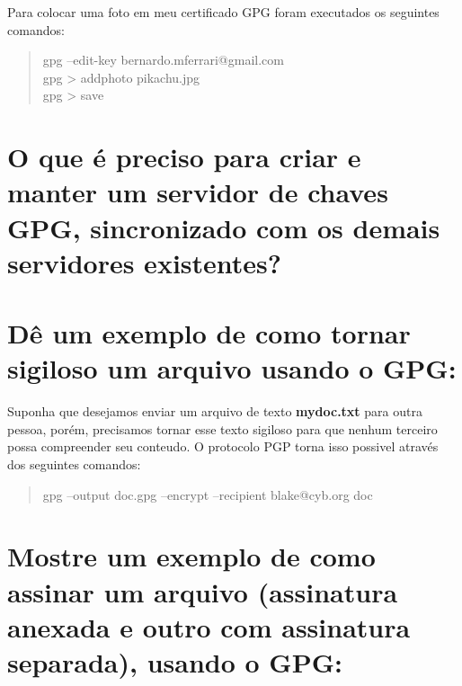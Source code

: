 \documentclass[12pt, letterpaper]{article}
\begin{document}
Para colocar uma foto em meu certificado GPG foram executados os seguintes comandos:
\begin{quote}
  gpg --edit-key bernardo.mferrari@gmail.com \\
  gpg \textgreater{} addphoto pikachu.jpg \\
  gpg \textgreater{} save
\end{quote}

\section{O que é preciso para criar e manter um servidor de chaves GPG, sincronizado com os demais servidores existentes?}

\section{Dê um exemplo de como tornar sigiloso um arquivo usando o GPG:}

Suponha que desejamos enviar um arquivo de texto \textbf{mydoc.txt} para outra pessoa, porém,
precisamos tornar esse texto sigiloso para que nenhum terceiro possa compreender seu conteudo.
O protocolo PGP torna isso possivel através dos seguintes comandos:
\begin{quote}
  gpg --output doc.gpg --encrypt --recipient blake@cyb.org doc
\end{quote}

\section{Mostre um exemplo de como assinar um arquivo (assinatura anexada e outro com assinatura separada), usando o GPG:}
\end{document}
